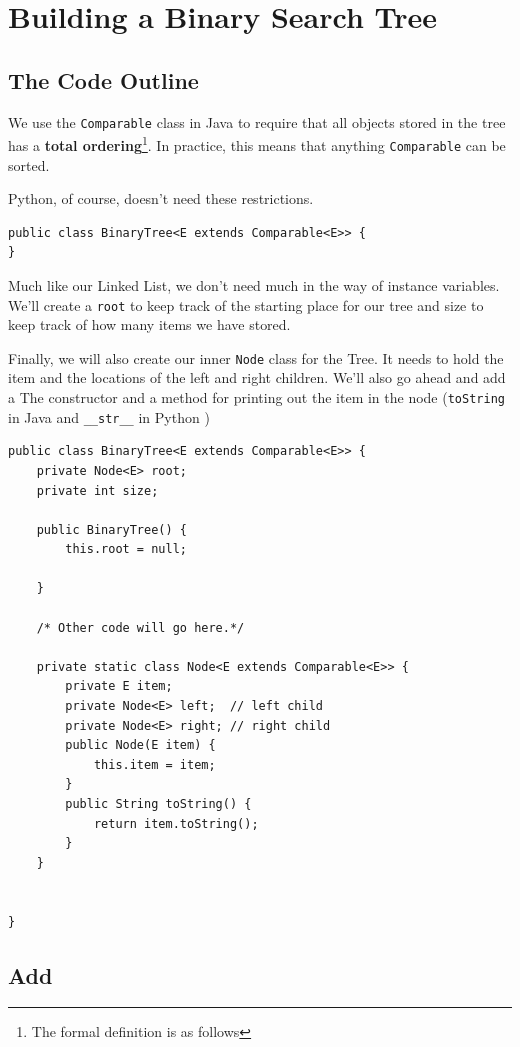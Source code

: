 \documentclass[10pt,a4paper]{book}
\begin{document}
\section{Building a Binary Search Tree}

\subsection{The Code Outline}


We use the \texttt{Comparable} class in Java to require that all objects stored in the tree has a \textbf{total ordering}\footnote{The formal definition is as follows}.%
In practice, this means that anything \texttt{Comparable} can be sorted.

Python, of course, doesn't need these restrictions.
\begin{verbatim}
public class BinaryTree<E extends Comparable<E>> {
}
\end{verbatim}




Much like our Linked List, we don't need much in the way of instance variables.  We'll create a \texttt{root} to keep track of the starting place for our tree and size to keep track of how many items we have stored.

Finally, we will also create our inner \texttt{Node} class for the Tree.
It needs to hold the item and the locations of the left and right children.
We'll also go ahead and add a The constructor and a method for printing out the item in the node (\texttt{toString} in Java and \texttt{\_\_str\_\_} in Python )

\begin{verbatim}
public class BinaryTree<E extends Comparable<E>> {
	private Node<E> root;
	private int size;
	
	public BinaryTree() {
		this.root = null;
		
	}

	/* Other code will go here.*/

	private static class Node<E extends Comparable<E>> {
		private E item;
		private Node<E> left;  // left child
		private Node<E> right; // right child
		public Node(E item) {
			this.item = item;
		}
		public String toString() {
			return item.toString();
		}
	}

	
}
\end{verbatim}


\subsection{Add}
\end{document}
